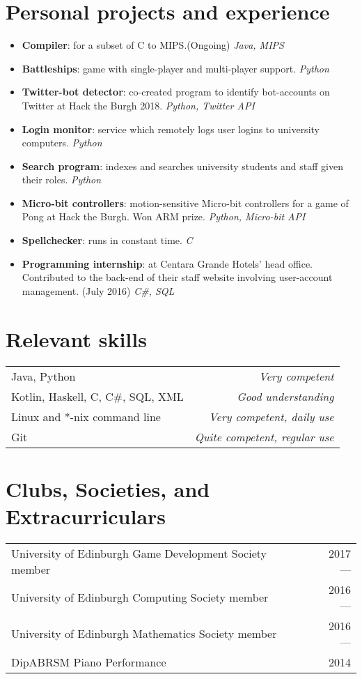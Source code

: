 \documentclass[11pt,a4paper]{article}
\begin{document}
\section*{Personal projects and experience}
\begin{itemize}
    \item \textbf{Compiler}:
        for a subset of C to MIPS.\@(Ongoing)
        \textit{Java, MIPS}
    \item \textbf{Battleships}: game with single-player and multi-player support.
        \textit{Python}
    \item \textbf{Twitter-bot detector}:
        co-created program to identify bot-accounts on Twitter at Hack the Burgh 2018.
        \textit{Python, Twitter API}
    \item \textbf{Login monitor}:
        service which remotely logs user logins to university computers.
        \textit{Python}
    \item \textbf{Search program}:
        indexes and searches university students and staff given their roles.
        \textit{Python}
    \item \textbf{Micro-bit controllers}:
        motion-sensitive Micro-bit controllers for a game of Pong at Hack the Burgh.
        Won ARM prize.
        \textit{Python, Micro-bit API}
    \item \textbf{Spellchecker}:
        runs in constant time.
        \textit{C}
    \item \textbf{Programming internship}:
        at Centara Grande Hotels' head office.
        Contributed to the back-end of their staff website involving user-account management.
        (July 2016)
        \textit{C#, SQL} 
\end{itemize}

\hline
\section*{Relevant skills}
\begin{tabularx}{\textwidth}{X r}
    Java, Python & \textit{Very competent} \\
    Kotlin, Haskell, C, C#, SQL, XML & \textit{Good understanding} \\
    Linux and *-nix command line & \textit{Very competent, daily use} \\
    Git & \textit{Quite competent, regular use} \\
\end{tabularx}

\hline
\section*{Clubs, Societies, and Extracurriculars}
\begin{tabularx}{\textwidth}{X r}
    University of Edinburgh Game Development Society member & 2017 --- \\
    University of Edinburgh Computing Society member & 2016 --- \\
    University of Edinburgh Mathematics Society member & 2016 ---\\
    DipABRSM Piano Performance & 2014
\end{tabularx}
\end{document}
